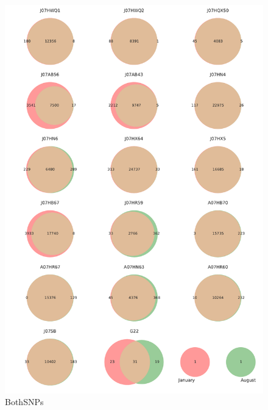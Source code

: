 \begin{figure}[!hbtp]
  \centering
  \includegraphics[width=\textwidth,height=0.9\textheight,keepaspectratio]{Chapter5/Figures/Venn_JanAugSNPs.pdf}
  \caption{BothSNPs}
  \label{VennBoth}
\end{figure}

